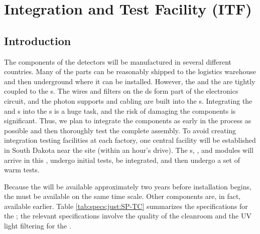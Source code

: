 \section{Integration and Test Facility (ITF)}
\label{sec:fdsp-tc-itf}

\subsection{Introduction}
\label{sec:fdsp-tc-itf-intro}


The components of the  detectors will be manufactured in several different countries. 
Many of the parts can be reasonably shipped to the logistics warehouse and then underground where it can be installed. 
However, the   and the  are tightly coupled to the s. 
The wires and filters on the ds form part of the electronics circuit, and the photon supports and cabling are built into the s. 
Integrating the  and s into the s is a huge task, and the risk of damaging the components is significant. Thus, we plan to integrate the components as early in the process as possible and then thoroughly test the complete assembly.
To avoid creating integration testing facilities at each factory, one central facility will be established in South Dakota near the  site  (within an hour's drive). 
The s, , and  modules will arrive in this , undergo initial tests, be integrated, and then undergo a set of warm tests. 

Because the  will be available approximately two years before installation begins, the  must be available on the same time scale. Other components are, in fact, available earlier. 
Table \ref{tab:specs:just:SP-TC} summarizes the specifications for the ;  
the relevant specifications involve the quality of the cleanroom and the UV light filtering for the .






